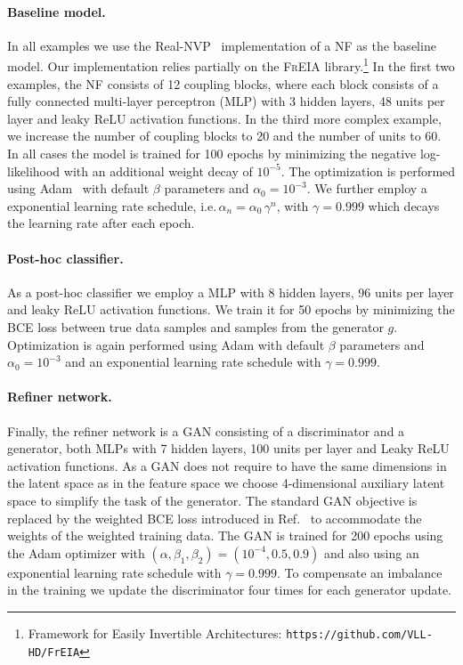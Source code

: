 \paragraph{Baseline model.}
In all examples we use the Real-NVP~\cite{RNVP2019} implementation of a NF as the baseline model. Our implementation relies partially on the \textsc{FrEIA} library.\footnote{Framework for Easily Invertible Architectures: \texttt{https://github.com/VLL-HD/FrEIA}}
In the first two examples, the NF consists of 12 coupling blocks, where each block consists of a fully connected multi-layer perceptron (MLP) with 3 hidden layers, 48 units per layer and leaky ReLU activation functions. In the third more complex example, we increase the number of coupling blocks to 20 and the number of units to 60. In all cases the model is trained for 100 epochs by minimizing the negative log-likelihood with an additional weight decay of $10^{-5}$. The optimization is performed using Adam~\cite{Adam2019} with default $\beta$ parameters and $\alpha_0 = 10^{-3}$. We further employ a exponential learning rate schedule, i.e.\,$\alpha_n = \alpha_0\,\gamma^n$,
with $\gamma = 0.999$ which decays the learning rate after each epoch.

\paragraph{Post-hoc classifier.}
As a post-hoc classifier we employ a MLP with 8 hidden layers, 96 units per layer and leaky ReLU activation functions. We train it for 50 epochs by minimizing the BCE loss between true data samples and samples from the generator $g$. Optimization is again performed using Adam with default $\beta$ parameters and $\alpha_0 = 10^{-3}$ and an exponential learning rate schedule with $\gamma = 0.999$.

\paragraph{Refiner network.}
Finally, the refiner network is a GAN consisting of a discriminator and a generator, both MLPs with 7 hidden layers, 100 units per layer and Leaky ReLU activation functions.
As a GAN does not require to have the same dimensions in the latent space as in the feature space we choose 4-dimensional auxiliary latent space to simplify the task of the generator. The standard GAN objective is replaced by the weighted BCE loss introduced in Ref.~\cite{Backes:2020vka} to accommodate the weights of the weighted training data. The GAN is trained for 200 epochs using the Adam optimizer with $(\alpha, \beta_1, \beta_2) = (10^{-4}, 0.5, 0.9)$ and also using an exponential learning rate schedule with $\gamma = 0.999$. To compensate an imbalance in the training we update the discriminator four times for each generator update.

